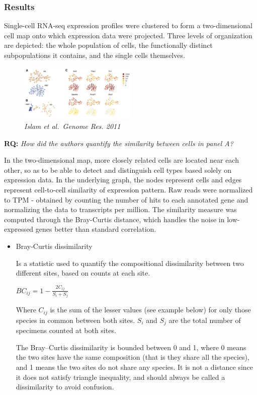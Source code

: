 \hypertarget{results-1}{%
\subsubsection{Results}\label{results-1}}

Single-cell RNA-seq expression profiles were clustered to form a
two-dimensional cell map onto which expression data were projected.
Three levels of organization are depicted: the whole population of
cells, the functionally distinct subpopulations it contains, and the
single cells themselves.

\begin{figure}
\centering
\includegraphics[width=0.5\textwidth]{images/Screen_Shot_2023-02-20_at_19-24-40.png}
\caption{\emph{Islam et al.~Genome Res. 2011}}
\end{figure}

\begin{tcolorbox}
[width=\linewidth, sharp corners=all, colback=white!95!black]

\textbf{RQ: }\emph{How did the authors quantify the similarity between cells in panel
A?}

In the two-dimensional map, more closely related cells are located near
each other, so as to be able to detect and distinguish cell types based
solely on expression data. In the underlying graph, the nodes represent
cells and edges represent cell-to-cell similarity of expression pattern.
Raw reads were normalized to TPM - obtained by counting the number of
hits to each annotated gene and normalizing the data to transcripts per
million. The similarity measure was computed through the Bray-Curtis
distance, which handles the noise in low-expressed genes better than
standard correlation.
\end{tcolorbox}


\begin{itemize}
\item
  Bray-Curtis dissimilarity

  Is a statistic used to quantify the compositional dissimilarity
  between two different sites, based on counts at each site.

  \(BC_{ij}=1-\frac{2C_{ij}}{S_i+S_j}\)

  Where \(C_{ij}\) is the sum of the lesser values (see example below)
  for only those species in common between both sites. \(S_i\) and
  \(S_j\) are the total number of specimens counted at both sites.

  The Bray--Curtis dissimilarity is bounded between 0 and 1, where 0
  means the two sites have the same composition (that is they share all
  the species), and 1 means the two sites do not share any species. It
  is not a distance since it does not satisfy triangle inequality, and
  should always be called a dissimilarity to avoid confusion.
\end{itemize}

